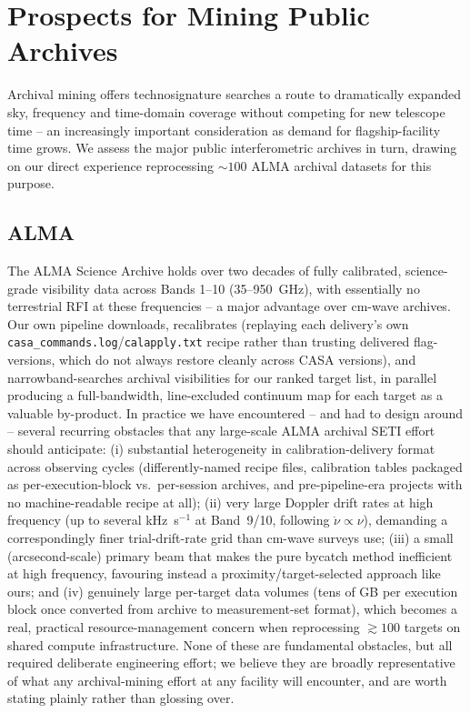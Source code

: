 \documentclass[10pt,twocolumn]{article}
\begin{document}
\section{Prospects for Mining Public Archives}
Archival mining offers technosignature searches a route to dramatically expanded sky, frequency and time-domain coverage without competing for new telescope time -- an increasingly important consideration as demand for flagship-facility time grows. We assess the major public interferometric archives in turn, drawing on our direct experience reprocessing $\sim100$ ALMA archival datasets for this purpose.

\subsection{ALMA}
The ALMA Science Archive holds over two decades of fully calibrated, science-grade visibility data across Bands 1--10 (35--950~GHz), with essentially no terrestrial RFI at these frequencies -- a major advantage over cm-wave archives. Our own pipeline downloads, recalibrates (replaying each delivery's own \texttt{casa\_commands.log}/\texttt{calapply.txt} recipe rather than trusting delivered flag-versions, which do not always restore cleanly across CASA versions), and narrowband-searches archival visibilities for our ranked target list, in parallel producing a full-bandwidth, line-excluded continuum map for each target as a valuable by-product. In practice we have encountered -- and had to design around -- several recurring obstacles that any large-scale ALMA archival SETI effort should anticipate: (i) substantial heterogeneity in calibration-delivery format across observing cycles (differently-named recipe files, calibration tables packaged as per-execution-block vs.\ per-session archives, and pre-pipeline-era projects with no machine-readable recipe at all); (ii) very large Doppler drift rates at high frequency (up to several kHz~s$^{-1}$ at Band~9/10, following $\dot\nu\propto\nu$), demanding a correspondingly finer trial-drift-rate grid than cm-wave surveys use; (iii) a small (arcsecond-scale) primary beam that makes the pure bycatch method inefficient at high frequency, favouring instead a proximity/target-selected approach like ours; and (iv) genuinely large per-target data volumes (tens of GB per execution block once converted from archive to measurement-set format), which becomes a real, practical resource-management concern when reprocessing $\gtrsim100$ targets on shared compute infrastructure. None of these are fundamental obstacles, but all required deliberate engineering effort; we believe they are broadly representative of what any archival-mining effort at any facility will encounter, and are worth stating plainly rather than glossing over.
\end{document}
